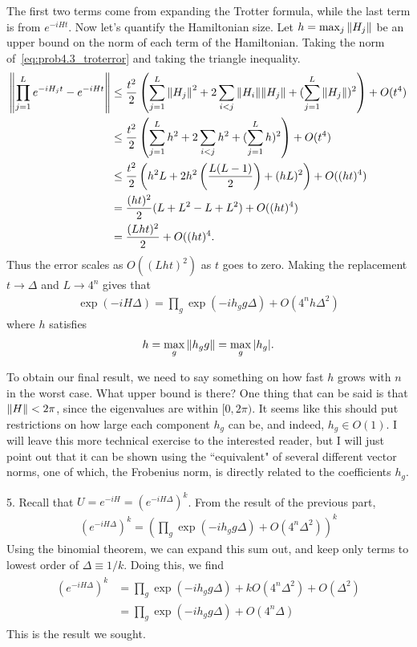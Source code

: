 \documentclass{book}
\begin{document}
    The first two terms come from expanding the Trotter formula, while the last term is from $e^{-iHt}$. Now let's quantify the Hamiltonian size. Let $h = \max_j{\norm{H_j}}$ be an upper bound on the norm of each term of the Hamiltonian. Taking the norm of~\eqref{eq:prob4.3_troterror} and taking the triangle inequality.
    \begin{align}
    \begin{aligned}
        \norm{\prod_{j=1}^L e^{-i H_j t} - e^{-i H t}} &\leq \frac{t^2}{2}\left(\sum_{j=1}^L \norm{H_j}^2 + 2 \sum_{i<j} \norm{H_i} \norm{H_j} + (\sum_{j=1}^L \norm{H_j})^2\right) + O(t^4) \\
        &\leq \frac{t^2}{2}\left(\sum_{j=1}^L h^2 + 2 \sum_{i<j} h^2 + (\sum_{j=1}^L h)^2\right) + O(t^4)\\
        &\leq \frac{t^2}{2}\left(h^2 L + 2 h^2 \left(\frac{L(L-1)}{2}\right) + (hL )^2\right) + O((ht)^4) \\
        &= \frac{(ht)^2}{2}(L + L^2 - L + L^2) +  O((ht)^4)\\
        &= \frac{(Lht)^2}{2} + O((ht)^4.
    \end{aligned}
    \end{align}
    Thus the error scales as $O((Lht)^2)$ as $t$ goes to zero. Making the replacement $t \rightarrow \Delta$ and $L \rightarrow 4^n$ gives that
    \begin{align}
        \exp(-i H \Delta) = \prod_g \exp(-i h_g g \Delta) + O(4^n h \Delta^2)
    \end{align}
    where $h$ satisfies
    \begin{align}
        h = \max_g \norm{h_g g} = \max_g \abs{h_g}.
    \end{align}

    To obtain our final result, we need to say something on how fast $h$ grows with $n$ in the worst case. What upper bound is there? One thing that can be said is that $\norm{H} < 2\pi$, since the eigenvalues are within $[0,2\pi)$. It seems like this should put restrictions on how large each component $h_g$ can be, and indeed, $h_g \in O(1)$. I will leave this more technical exercise to the interested reader, but I will just point out that it can be shown using the ``equivalent" of several different vector norms, one of which, the Frobenius norm, is directly related to the coefficients $h_g$. 

    5. Recall that $U = e^{-i H} = (e^{-i H \Delta})^k$. From the result of the previous part,
    \begin{align}
        (e^{-i H \Delta})^k = \left(\prod_g \exp(-i h_g g \Delta) + O(4^n \Delta^2)\right)^k
    \end{align}
    Using the binomial theorem, we can expand this sum out, and keep only terms to lowest order of $\Delta \equiv 1/k$. Doing this, we find
    \begin{align}
    \begin{aligned}
        (e^{-i H \Delta})^k &= \prod_g \exp(-i h_g g \Delta) + k O(4^n \Delta^2) + O(\Delta^2) \\
        &= \prod_g \exp(-i h_g g \Delta) + O(4^n \Delta)
    \end{aligned}
    \end{align}
    This is the result we sought.
\end{document}
